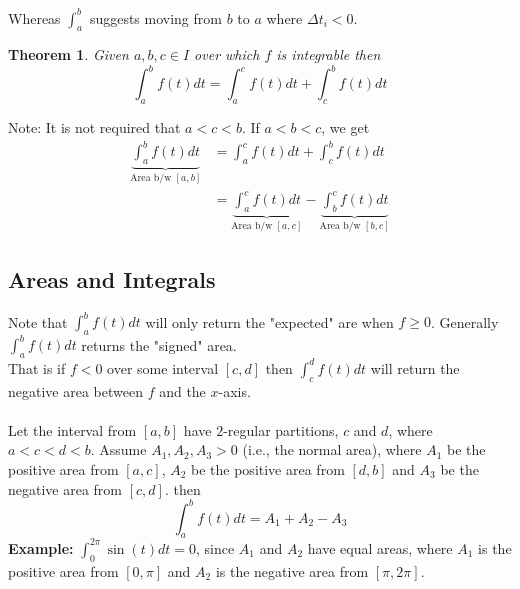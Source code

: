 \documentclass[10pt]{article}
\theoremstyle{break}
\newtheorem{thm}{Theorem}[subsection]
\begin{document}
Whereas $\int^b_a$ suggests moving from $b$ to $a$ where $\Delta t_i < 0$.
\begin{thm}
Given $a, b, c \in I$ over which $f$ is integrable then $$\int^b_a f(t) dt = \int^c_a f(t) dt + \int^b_c f(t) dt$$
\end{thm}
Note: It is not required that $a < c < b$. 
If $a< b< c$, we get
\begin{align*}
    \underbrace{\int^b_a f(t) dt}_{\text{Area b/w } [a, b]} &= \int^c_a f(t) dt + \int^b_c f(t) dt\\
    &= \underbrace{\int^c_a f(t) dt}_{\text{Area b/w }[a, c]} -\underbrace{\int^c_b f(t) dt}_{\text{Area b/w }[b, c]}
\end{align*}

\subsection{Areas and Integrals}
Note that $\int^b_a f(t) dt$ will only return the "expected" are when $f \ge 0$. Generally $\int^b_a f(t) dt$ returns the "signed" area.\\
That is if $f < 0$ over some interval $[c, d]$ then $\int^d_c f(t) dt$ will return the negative area between $f$ and the $x$-axis.\\ \space \\
Let the interval from $[a, b]$ have $2$-regular partitions, $c$ and $d$, where $a < c < d < b$. Assume $A_1, A_2, A_3 > 0$ (i.e., the normal area), where $A_1$ be the positive area from $[a, c]$, $A_2$ be the positive area from $[d, b]$ and $A_3$ be the negative area from $[c, d]$.
then $$\int^b_a f(t) dt = A_1 + A_2 - A_3$$
\textbf{Example:}
$\int^{2\pi}_0 \sin(t) dt = 0$, since $A_1$ and $A_2$ have equal areas, where $A_1$ is the positive area from $[0, \pi]$ and $A_2$ is the negative area from $[\pi, 2\pi]$.
\end{document}
